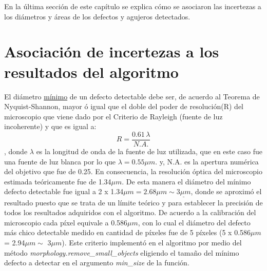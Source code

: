 En la última sección de este capítulo se explica cómo se asociaron las incertezas a los diámetros y áreas de los defectos y agujeros detectados.

\singlespacing
\section{Asociación de incertezas a los resultados del algoritmo}
\label{sec:incert}

\hspace{0.5cm} El diámetro \underline{mínimo} de un defecto detectable debe ser, de acuerdo al Teorema de Nyquist-Shannon, mayor ó igual que el doble del poder de resolución(R) del microscopio que viene dado por el Criterio de Rayleigh (fuente de luz incoherente) y que es igual a:
\begin{equation}
R = \frac{0.61 \hspace{2pt} \lambda}{ N.A.}
\end{equation},
donde $\lambda$ es la longitud de onda de la fuente de luz utilizada, que en este caso fue una fuente de luz blanca por lo que $\lambda = 0.55 \mu m$. y, N.A. es la apertura numérica del objetivo que fue de 0.25. En consecuencia, la resolución óptica del microscopio estimada teóricamente fue de 1.34$\mu m$. De esta manera el diámetro del mínimo defecto detectable fue igual a 2 x 1.34$\mu m = 2.68 \mu m \sim \underline{3 \mu m}$, donde se aproximó el resultado puesto que se trata de un límite teórico y para establecer la precisión de todos los resultados adquiridos con el algoritmo. De acuerdo a la calibración del microscopio cada píxel equivale a 0.586$\mu m$, con lo cual el diámetro del defecto más chico detectable medido en cantidad de píxeles fue de 5 píxeles (5 x 0.586$\mu m$ = 2.94$\mu m \sim$ 3$\mu m$). Este criterio implementó en el algoritmo por medio del método \textit{morphology.remove\_small\_objects} eligiendo el tamaño del mínimo defecto a detectar en el argumento \textit{min\_size} de la función.

